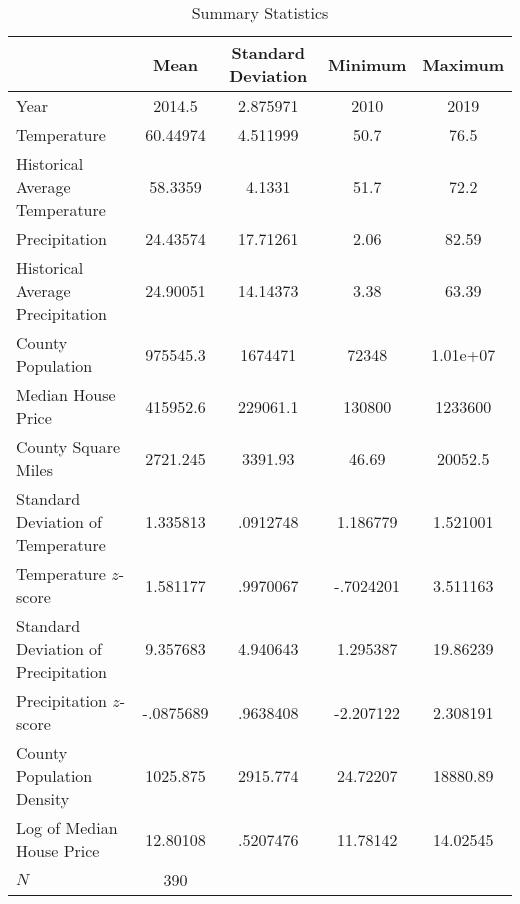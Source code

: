 \begin{table*}[htbp]\centering\label{table:summ-stats}
\def\sym#1{\ifmmode^{#1}\else\(^{#1}\)\fi}
\caption{Summary Statistics}
\begin{tabular}{l*{1}{cccc}}
\hline\hline
            &        Mean&          Standard Deviation&         Minimum&         Maximum\\
\hline
Year        &      2014.5&    2.875971&        2010&        2019\\
Temperature        &    60.44974&    4.511999&        50.7&        76.5\\
Historical Average Temperature   &     58.3359&      4.1331&        51.7&        72.2\\
Precipitation     &    24.43574&    17.71261&        2.06&       82.59\\
Historical Average Precipitation &    24.90051&    14.14373&        3.38&       63.39\\
County Population  &    975545.3&     1674471&       72348&    1.01e+07\\
Median House Price&    415952.6&    229061.1&      130800&     1233600\\
County Square Miles       &    2721.245&     3391.93&       46.69&     20052.5\\
Standard Deviation of Temperature     &    1.335813&    .0912748&    1.186779&    1.521001\\
Temperature $z$-score    &    1.581177&    .9970067&   -.7024201&    3.511163\\
Standard Deviation of Precipitation  &    9.357683&    4.940643&    1.295387&    19.86239\\
Precipitation $z$-score  &   -.0875689&    .9638408&   -2.207122&    2.308191\\
County Population Density&    1025.875&    2915.774&    24.72207&    18880.89\\
Log of Median House Price&    12.80108&    .5207476&    11.78142&    14.02545\\
\hline
\(N\)       &         390&            &            &            \\
\hline\hline
\end{tabular}
\end{table*}

